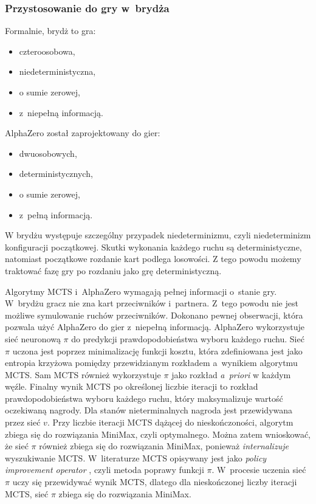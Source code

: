 \subsubsection{Przystosowanie do gry w~brydża}

Formalnie, brydż to gra:
\begin{itemize}
    \item czteroosobowa,
    \item niedeterministyczna,
    \item o sumie zerowej,
    \item z~niepełną informacją.
\end{itemize}

AlphaZero został zaprojektowany do gier:
\begin{itemize}
    \item dwuosobowych,
    \item deterministycznych,
    \item o sumie zerowej,
    \item z~pełną informacją.
\end{itemize}

W brydżu występuje szczególny przypadek niedeterminizmu,
czyli niedeterminizm konfiguracji początkowej.
Skutki wykonania każdego ruchu są deterministyczne,
natomiast początkowe rozdanie kart podlega losowości.
Z tego powodu możemy traktować fazę gry po rozdaniu jako
grę deterministyczną.

Algorytmy MCTS i~AlphaZero wymagają pełnej informacji o~stanie gry.
W~brydżu gracz nie zna kart przeciwników i~partnera.
Z~tego powodu nie jest możliwe symulowanie ruchów przeciwników.
Dokonano pewnej obserwacji, która pozwala użyć AlphaZero do gier
z~niepełną informacją.
AlphaZero wykorzystuje sieć neuronową $\pi$ do predykcji
prawdopodobieństwa wyboru każdego ruchu.
Sieć $\pi$ uczona jest poprzez minimalizację funkcji kosztu,
która zdefiniowana jest jako entropia krzyżowa pomiędzy
przewidzianym rozkładem a~wynikiem algorytmu MCTS.
Sam MCTS również wykorzystuje $\pi$ jako rozkład
\textit{a~priori} w każdym węźle.
Finalny wynik MCTS po określonej liczbie iteracji
to rozkład prawdopodobieństwa wyboru każdego ruchu,
który maksymalizuje wartość oczekiwaną nagrody.
Dla stanów nieterminalnych nagroda jest przewidywana
przez sieć $v$.
Przy liczbie iteracji MCTS dążącej do nieskończoności,
algorytm zbiega się do rozwiązania MiniMax, czyli optymalnego.
Można zatem wnioskować, że sieć $\pi$ również zbiega się
do rozwiązania MiniMax, ponieważ \textit{internalizuje}
wyszukiwanie MCTS. W~literaturze MCTS opisywany jest jako
\textit{policy improvement operator} \cite{MuZeroPaper,EfficientZeroPaper},
czyli metoda poprawy funkcji $\pi$.
W~procesie uczenia sieć $\pi$ uczy się przewidywać wynik MCTS,
dlatego dla nieskończonej liczby iteracji MCTS,
sieć $\pi$ zbiega się do rozwiązania MiniMax.

